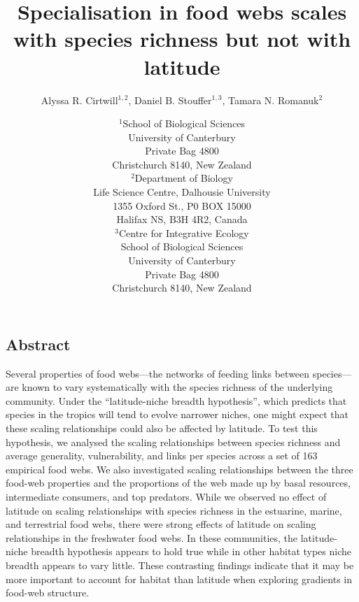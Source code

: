 \documentclass[12pt]{article}
\begin{document}
\title{Specialisation in food webs scales with species richness but not with latitude}
\author{Alyssa R. Cirtwill$^{1,2}$, Daniel B. Stouffer$^{1,3}$, Tamara N. Romanuk$^{2}$}
\date{\small$^1$School of Biological Sciences\\University of Canterbury\\
Private Bag 4800\\Christchurch 8140, New Zealand \\
\medskip$^2$Department of Biology\\
Life Science Centre, Dalhousie University\\1355 Oxford St., P0 BOX 15000\\
Halifax NS, B3H 4R2, Canada\\
\medskip$^3$Centre for Integrative Ecology\\School of Biological Sciences\\University of Canterbury\\
Private Bag 4800\\Christchurch 8140, New Zealand \\}

\maketitle
\baselineskip=8.5mm
 
\vspace{-0.3 in}

\begin{spacing}{1.0}
\section*{Abstract}

Several properties of food webs---the networks of feeding links between
species---are known to vary systematically with the species richness of the underlying
community.  Under the ``latitude-niche breadth hypothesis'', which predicts
that species in the tropics will tend to evolve narrower niches, one might
expect that these scaling relationships could also be affected by latitude. To
test this hypothesis, we analysed the scaling relationships between species
richness and average generality, vulnerability, and links per species across a
set of 163 empirical food webs.  We also investigated scaling relationships
between the three food-web properties and the proportions of the web made up
by basal resources, intermediate consumers, and top predators. While we
observed no effect of latitude on scaling relationships with species richness
in the estuarine, marine, and terrestrial food webs, there were strong effects
of latitude on scaling relationships in the freshwater food webs. In these
communities, the latitude-niche breadth hypothesis appears to hold true while
in other habitat types niche breadth appears to vary little. These contrasting
findings indicate that it may be more important to account for habitat than
latitude when exploring gradients in food-web structure.

\end{spacing}
\end{document}
